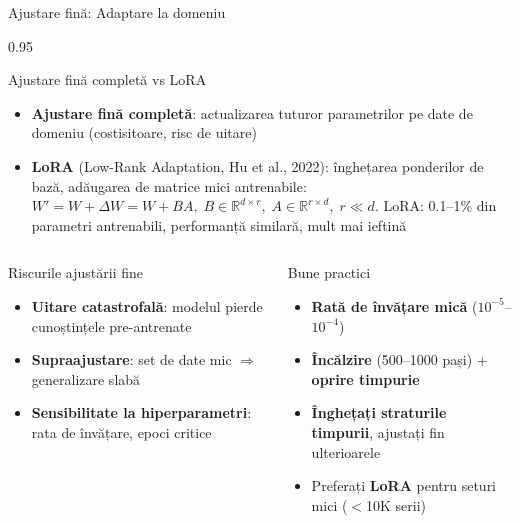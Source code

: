 \documentclass[9pt, aspectratio=169, t]{beamer}
\begin{document}
\begin{frame}{Ajustare fină: Adaptare la domeniu}
    \begin{cminipage}{0.95\textwidth}
    \vspace{-3mm}
    \begin{block}{Ajustare fină completă vs LoRA}
        {\scriptsize
        \begin{itemize}\setlength{\itemsep}{0pt}
            \item \textbf{Ajustare fină completă}: actualizarea tuturor parametrilor pe date de domeniu (costisitoare, risc de uitare)
            \item \textbf{LoRA} (Low-Rank Adaptation, Hu et al., 2022): înghețarea ponderilor de bază, adăugarea de matrice mici antrenabile:
            $W' = W + \Delta W = W + BA, \; B \in \mathbb{R}^{d \times r},\; A \in \mathbb{R}^{r \times d},\; r \ll d$.
            LoRA: 0.1--1\% din parametri antrenabili, performanță similară, mult mai ieftină
        \end{itemize}
        }
    \end{block}
    \vspace{-3mm}
    \begin{columns}[T]
        \begin{alertblock}{Riscurile ajustării fine}
            {\scriptsize
            \begin{itemize}\setlength{\itemsep}{0pt}
                \item \textbf{Uitare catastrofală}: modelul pierde cunoștințele pre-antrenate
                \item \textbf{Supraajustare}: set de date mic $\Rightarrow$ generalizare slabă
                \item \textbf{Sensibilitate la hiperparametri}: rata de învățare, epoci critice
            \end{itemize}
            }
        \end{alertblock}

        \begin{exampleblock}{Bune practici}
            {\scriptsize
            \begin{itemize}\setlength{\itemsep}{0pt}
                \item \textbf{Rată de învățare mică} ($10^{-5}$--$10^{-4}$)
                \item \textbf{Încălzire} (500--1000 pași) + \textbf{oprire timpurie}
                \item \textbf{Înghețați straturile timpurii}, ajustați fin ulterioarele
                \item Preferați \textbf{LoRA} pentru seturi mici ($<$10K serii)
            \end{itemize}
            }
        \end{exampleblock}
    \end{columns}
    \end{cminipage}
\end{frame}
\end{document}
